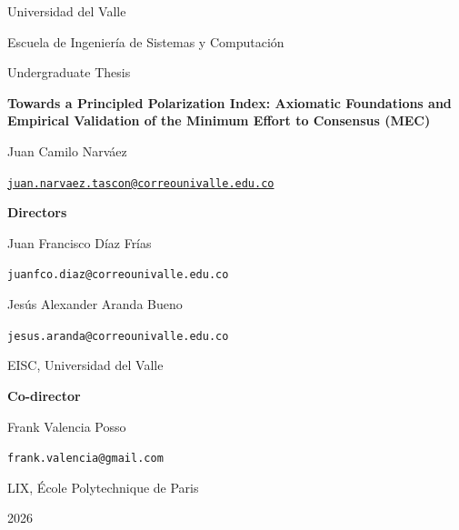 \documentclass{article}
\theoremstyle{plain}
\theoremstyle{remark}
\begin{document}
\begin{titlepage}
\centering
{\large Universidad del Valle\par}
\medskip
Escuela de Ingeniería de Sistemas y Computación\par
\vspace{1cm}
Undergraduate Thesis\par
\vfill
{\LARGE\bfseries Towards a Principled Polarization Index: Axiomatic Foundations and Empirical Validation of the Minimum Effort to Consensus (MEC)\par}
\vspace{1.5cm}
{\Large Juan Camilo Narváez\par}
\medskip
\href{mailto:juan.narvaez.tascon@correounivalle.edu.co}{\nolinkurl{juan.narvaez.tascon@correounivalle.edu.co}}\par
\vfill
\textbf{Directors}\par
\medskip
Juan Francisco Díaz Frías\par
\nolinkurl{juanfco.diaz@correounivalle.edu.co}\par
\medskip
Jesús Alexander Aranda Bueno\par
\nolinkurl{jesus.aranda@correounivalle.edu.co}\par
\medskip
EISC, Universidad del Valle\par
\vspace{0.6cm}
\textbf{Co-director}\par
\medskip
Frank Valencia Posso\par
\nolinkurl{frank.valencia@gmail.com}\par
\medskip
LIX, École Polytechnique de Paris\par
\vfill
2026\par
\end{titlepage}
\end{document}
